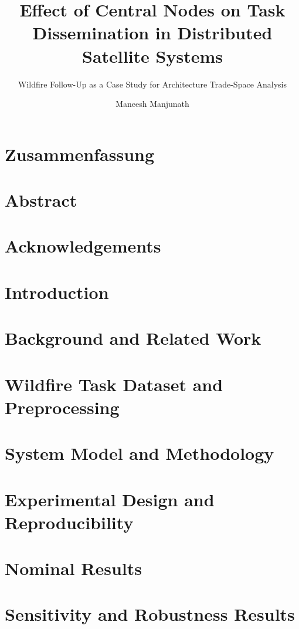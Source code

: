 \documentclass[
  a4paper,
  thesis=student,
  english,
  coverpage=false,
  titlepage=false,
  oneside,
  headmarks=true
]{tumbook}
\title{Effect of Central Nodes on Task Dissemination in Distributed Satellite Systems}
\subtitle{Wildfire Follow-Up as a Case Study for Architecture Trade-Space Analysis}
\author{Maneesh Manjunath}
\begin{document}
\frontmatter
\maketitle

\chapter{Zusammenfassung}

\chapter{Abstract}

\chapter{Acknowledgements}


\tableofcontents
\listoffigures
{}
\listoftables
{}
\glsaddall
\printreportglossary

\mainmatter
\chapter{Introduction}

\chapter{Background and Related Work}

\chapter{Wildfire Task Dataset and Preprocessing}

\chapter{System Model and Methodology}

\chapter{Experimental Design and Reproducibility}

\chapter{Nominal Results}

\chapter{Sensitivity and Robustness Results}

\end{document}
